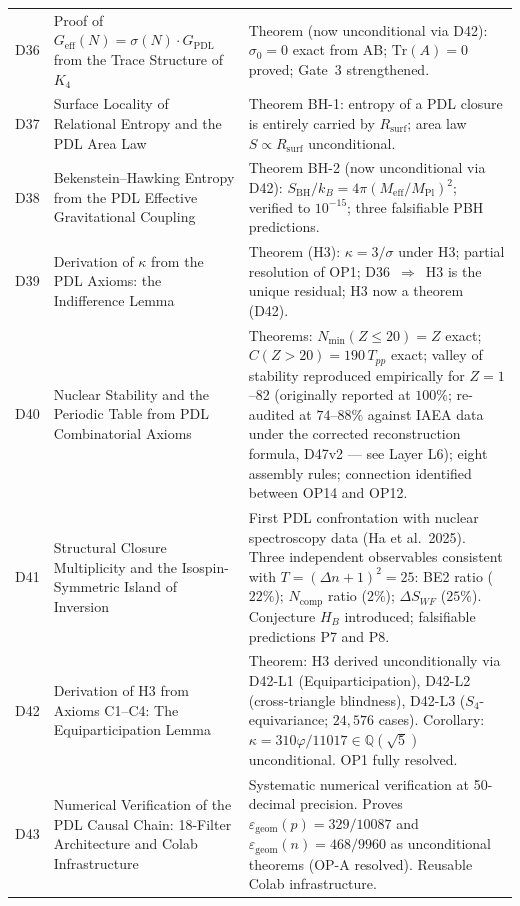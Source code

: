 \documentclass[11pt,a4paper]{article}
\theoremstyle{plain}
\theoremstyle{definition}
\theoremstyle{remark}
\newcommand{\Geff}{G_{\mathrm{eff}}}
\newcommand{\GPDL}{G_{\mathrm{PDL}}}
\newcommand{\Rsurf}{R_{\mathrm{surf}}}
\newcommand{\sigmaN}{\sigma(N)}
\newcommand{\SBH}{S_{\mathrm{BH}}}
\newcommand{\Meff}{M_{\mathrm{eff}}}
\newcommand{\MPl}{M_{\mathrm{Pl}}}
\newcommand{\Tpp}{T_{pp}}
\begin{document}
\begin{longtable}{L{1.3cm}L{3.8cm}L{8.0cm}}
D36 & Proof of $\Geff(N)=\sigmaN\cdot\GPDL$ from the Trace Structure of $K_4$~\cite{D36} & \textcolor{proofblue}{Theorem} (now unconditional via D42): $\sigma_0=0$ exact from AB; $\mathrm{Tr}(A)=0$ proved; Gate~3 strengthened.\\[0.4em]
D37 & Surface Locality of Relational Entropy and the PDL Area Law~\cite{D37} & \textcolor{proofblue}{Theorem BH-1}: entropy of a PDL closure is entirely carried by $\Rsurf$; area law $S\propto\Rsurf$ unconditional.\\[0.3em]
D38 & Bekenstein--Hawking Entropy from the PDL Effective Gravitational Coupling~\cite{D38} & \textcolor{proofblue}{Theorem BH-2} (now unconditional via D42): $\SBH/k_B=4\pi(\Meff/\MPl)^2$; verified to $10^{-15}$; three falsifiable PBH predictions.\\[0.3em]
D39 & Derivation of $\kappa$ from the PDL Axioms: the Indifference Lemma~\cite{D39} & \textcolor{proofblue}{Theorem (H3)}: $\kappa=3/\sigma$ under H3; partial resolution of OP1; D36~$\Rightarrow$~H3 is the unique residual; H3 now a theorem (D42).\\[0.4em]
D40 & Nuclear Stability and the Periodic Table from PDL Combinatorial Axioms~\cite{D40} & \textcolor{proofblue}{Theorems}: $N_{\min}(Z\leq20)=Z$ exact; $C(Z>20)=190\,\Tpp$ exact; valley of stability reproduced empirically for $Z=1$--82 (originally reported at $100\%$; re-audited at $74$--$88\%$ against IAEA data under the corrected reconstruction formula, D47v2 --- see Layer L6); eight assembly rules; connection identified between OP14 and OP12.\\[0.4em]
D41 & Structural Closure Multiplicity and the Isospin-Symmetric Island of Inversion~\cite{D41} & First PDL confrontation with nuclear spectroscopy data (Ha et al.~2025). Three independent observables consistent with $T=(\Delta n+1)^2=25$: BE2 ratio ($22\%$); $N_{\mathrm{comp}}$ ratio ($2\%$); $\Delta S_{WF}$ ($25\%$). Conjecture $H_B$ introduced; falsifiable predictions P7 and P8.\\[0.4em]
D42 & Derivation of H3 from Axioms C1--C4: The Equiparticipation Lemma~\cite{D42} & \textcolor{proofblue}{Theorem}: H3 derived unconditionally via D42-L1 (Equiparticipation), D42-L2 (cross-triangle blindness), D42-L3 ($S_4$-equivariance; $24{,}576$ cases). Corollary: $\kappa=310\varphi/11017\in\mathbb{Q}(\sqrt{5})$ unconditional. OP1 fully resolved.\\[0.4em]
D43 & Numerical Verification of the PDL Causal Chain: 18-Filter Architecture and Colab Infrastructure~\cite{D43} & Systematic numerical verification at 50-decimal precision. Proves $\varepsilon_{\mathrm{geom}}(p) = 329/10087$ and $\varepsilon_{\mathrm{geom}}(n) = 468/9960$ as unconditional theorems (OP-A resolved). Reusable Colab infrastructure.\\[0.4em]

\end{longtable}
\end{document}
